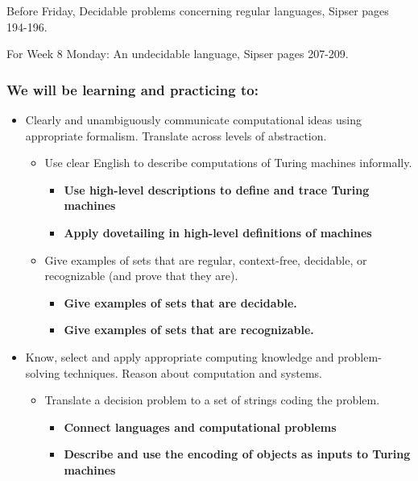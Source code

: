 Before Friday, Decidable problems concerning regular languages, 
Sipser pages 194-196.

For Week 8 Monday: An undecidable language, Sipser pages 207-209.

\vspace{-20pt}

\subsubsection*{We will be learning and practicing to:}

\vspace{-20pt}

\begin{itemize}
    \item Clearly and unambiguously communicate computational ideas using appropriate formalism. Translate across levels of abstraction.
    \begin{itemize}
        \item Use clear English to describe computations of Turing machines informally.
        \begin{itemize}
                \item {\bf Use high-level descriptions to define and trace Turing machines}
                \item {\bf Apply dovetailing in high-level definitions of machines}
        \end{itemize}
        \item Give examples of sets that are regular, context-free, decidable, or recognizable (and prove that they are).
        \begin{itemize}
          \item {\bf Give examples of sets that are decidable.}
          \item {\bf Give examples of sets that are recognizable.}
       \end{itemize}
    \end{itemize}
    \item Know, select and apply appropriate computing knowledge and problem-solving techniques. Reason about computation and systems.
    \begin{itemize}
        \item Translate a decision problem to a set of strings coding the problem.
        \begin{itemize}
        \item {\bf Connect languages and computational problems}
        \item {\bf Describe and use the encoding of objects as inputs to Turing machines}

\end{itemize}
\end{itemize}
\end{itemize}
